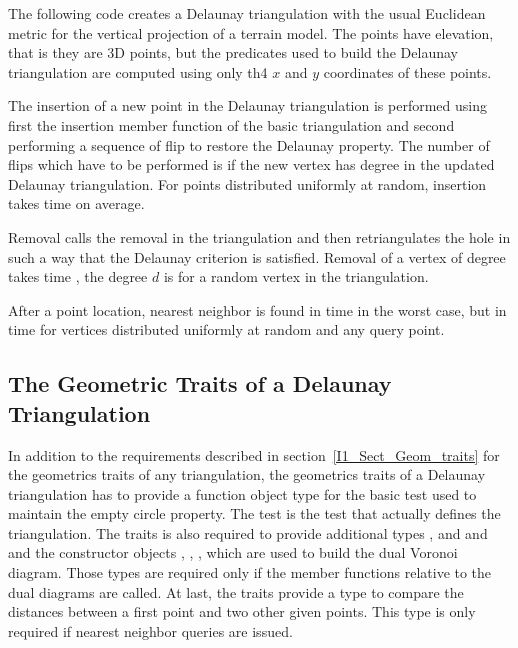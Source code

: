 \ccExample
The following code  creates a Delaunay triangulation with 
the usual Euclidean metric for the vertical projection of a 
terrain model. The points have elevation, that is they are 3D points,
but the predicates used to build the  Delaunay triangulation
are computed using only  th4 $x$ and $y$ coordinates  
of these points. 


The insertion of a new point in the Delaunay triangulation
is performed using first the insertion member function
of the basic triangulation and second 
performing a sequence of flip to restore the Delaunay property. 
The number of flips which have to be performed is 
if the new vertex has degree  in the updated
Delaunay triangulation. For
points distributed uniformly at random, insertion takes time  on
average.

Removal calls the removal in the triangulation and then retriangulates
the hole in such a way that  the Delaunay criterion is satisfied. Removal of a
vertex of degree  takes time ,
the degree $d$ is  for a random
vertex in the triangulation.

After a point location, nearest neighbor is found in time  in the
worst case, but in time 
for vertices distributed uniformly at random  and any query point. 



\subsection{The Geometric Traits of a Delaunay Triangulation}
\label{I1_Sect_Delaunay_geom_traits}

In addition to the requirements described in section~\ref{I1_Sect_Geom_traits}
for the geometrics traits of any triangulation,
the geometrics traits of a Delaunay triangulation
has to  provide a function object type  
for the basic  test used to maintain the
empty circle property.
The  test is the test 
that actually defines the triangulation.
The traits is also required 
to provide additional types ,  and
and  and the constructor objects
, 
, ,
 which 
are used to build the dual Voronoi diagram. Those types 
are required only if the member functions relative to
the dual diagrams  are called.
At last, the traits provide a type  
to compare the distances between a first point and two other
given points. This type 
 is only required
if nearest neighbor queries are issued.




